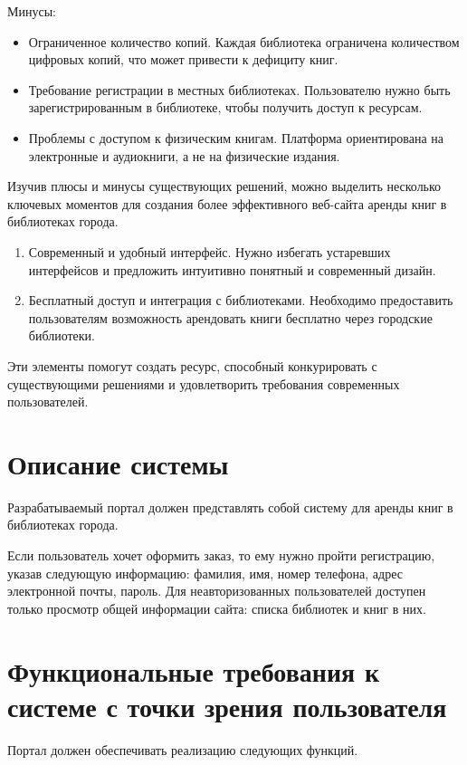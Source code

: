 \begin{enumerate}
  Минусы:
  \begin{itemize}
    \item Ограниченное количество копий. Каждая библиотека ограничена количеством цифровых копий, что может привести к дефициту книг.
    \item Требование регистрации в местных библиотеках. Пользователю нужно быть зарегистрированным в библиотеке, чтобы получить доступ к ресурсам.
    \item Проблемы с доступом к физическим книгам. Платформа ориентирована на электронные и аудиокниги, а не на физические издания.
  \end{itemize}
\end{enumerate}

Изучив плюсы и минусы существующих решений, можно выделить несколько ключевых моментов для создания более эффективного веб-сайта аренды книг в библиотеках города.
\begin{enumerate}
  \item Современный и удобный интерфейс. Нужно избегать устаревших интерфейсов и предложить интуитивно понятный и современный дизайн.
  \item Бесплатный доступ и интеграция с библиотеками. Необходимо предоставить пользователям возможность арендовать книги бесплатно через городские библиотеки.
\end{enumerate}

Эти элементы помогут создать ресурс, способный конкурировать с существующими решениями и удовлетворить требования современных пользователей.


\section{Описание системы}
Разрабатываемый портал должен представлять собой систему для аренды книг в библиотеках города. 

Если пользователь хочет оформить заказ, то ему нужно пройти регистрацию, указав следующую информацию: фамилия, имя, номер телефона, адрес электронной почты, пароль. Для неавторизованных пользователей доступен только просмотр общей информации сайта: списка библиотек и книг в них.


\section{Функциональные требования к системе с точки зрения пользователя}
Портал должен обеспечивать реализацию следующих функций.

